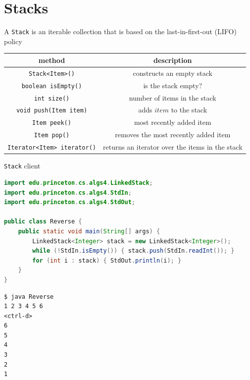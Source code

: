 \documentclass[8pt,a4paper,compress]{beamer}
\begin{document}
\section{Stacks}
\begin{frame}[fragile]
A \lstinline{Stack} is an iterable collection that is based on the last-in-first-out (LIFO) policy

\begin{center}
\begin{tabular}{cc}
method & description \\ \hline
\lstinline$Stack<Item>()$ & constructs an empty stack \\
\lstinline$boolean isEmpty()$ & is the stack empty? \\
\lstinline$int size()$ & number of items in the stack \\
\lstinline$void push(Item item)$ & adds $item$ to the stack \\
\lstinline$Item peek()$ & most recently added item \\
\lstinline$Item pop()$ & removes the most recently added item \\
\lstinline$Iterator<Item> iterator()$ & returns an iterator over the items in the stack
\end{tabular} 
\end{center}

\lstinline{Stack} client
\begin{lstlisting}[language=Java]
import edu.princeton.cs.algs4.LinkedStack;
import edu.princeton.cs.algs4.StdIn;
import edu.princeton.cs.algs4.StdOut;

public class Reverse {
    public static void main(String[] args) {
        LinkedStack<Integer> stack = new LinkedStack<Integer>();
        while (!StdIn.isEmpty()) { stack.push(StdIn.readInt()); }
        for (int i : stack) { StdOut.println(i); }
    }
}
\end{lstlisting}

\begin{lstlisting}[language={}]
$ java Reverse 
1 2 3 4 5 6
<ctrl-d>
6
5
4
3
2
1
\end{lstlisting}
\end{frame}
\end{document}
